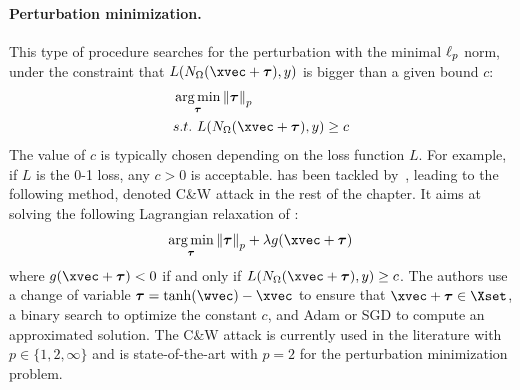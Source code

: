 \paragraph{Perturbation minimization.}
This type of procedure searches for the perturbation with the minimal $\ell_p $ norm, under the constraint that $L(\nn_\weights(\xvec + \adv), y)$ is bigger than a given bound $c$:
\begin{align}
  &\argmin_{\adv} \norm{\adv}_p \label{equation:ch2-normmin} \\
  &\st\ L(\nn_\weights(\xvec + \adv), y) \geq c \notag
\end{align}
The value of $c$ is typically chosen depending on the loss function $L$.
For example, if $L$ is the 0-1 loss, any $c > 0$ is acceptable.
 has been tackled by~\citet{carlini2017towards}, leading to the following method, denoted C\&W attack in the rest of the chapter.
It aims at solving the following Lagrangian relaxation of :
\begin{equation}
  \argmin_{\adv} \norm{\adv}_p + \lambda g(\xvec+\adv)
\end{equation}
where $g(\xvec + \adv)<0$ if and only if $L(\nn_\weights(\xvec + \adv),y) \geq c$.
The authors use a change of variable $\adv = \tanh(\wvec) - \xvec$ to ensure that $\xvec + \adv \in \Xset$, a binary search to optimize the constant $c$, and Adam or SGD to compute an approximated solution.
The C\&W attack is currently used in the literature with $p \in \{1, 2, \infty \}$ and is state-of-the-art with $p=2$ for the perturbation minimization problem.





